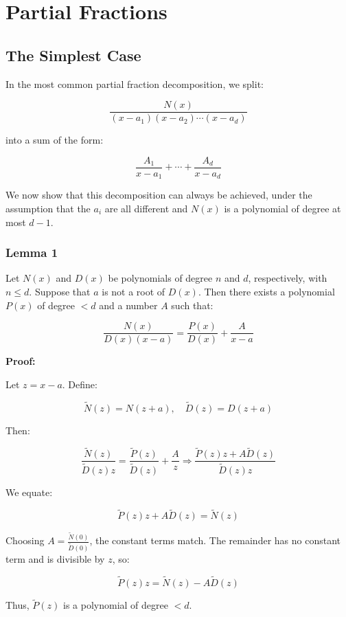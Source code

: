 \newpage
\section{Partial Fractions}

\subsection{The Simplest Case}

In the most common partial fraction decomposition, we split:

\[
    \frac{N(x)}{(x - a_1)(x - a_2)\cdots(x - a_d)}
\]

into a sum of the form:

\[
    \frac{A_1}{x - a_1} + \cdots + \frac{A_d}{x - a_d}
\]

We now show that this decomposition can always be achieved, under the assumption that the \(a_i\) are 
all different and \(N(x)\) is a polynomial of degree at most \(d - 1\).

\subsubsection{Lemma 1}

Let \(N(x)\) and \(D(x)\) be polynomials of degree \(n\) and \(d\), respectively, with \(n \leq d\). 
Suppose that \(a\) is not a root of \(D(x)\). Then there exists a polynomial \(P(x)\) of degree \(< d\) 
and a number \(A\) such that:

\[
    \frac{N(x)}{D(x)(x - a)} = \frac{P(x)}{D(x)} + \frac{A}{x - a}
\]

\textbf{Proof:} 

Let \(z = x - a\). Define:

\[
    \tilde{N}(z) = N(z + a), \quad \tilde{D}(z) = D(z + a)
\]

Then:

\[
    \frac{\tilde{N}(z)}{\tilde{D}(z)z} = \frac{\tilde{P}(z)}{\tilde{D}(z)} + \frac{A}{z}
    \Rightarrow \frac{\tilde{P}(z)z + A\tilde{D}(z)}{\tilde{D}(z)z}
\]

We equate:

\[
    \tilde{P}(z)z + A\tilde{D}(z) = \tilde{N}(z)
\]

Choosing \(A = \frac{\tilde{N}(0)}{\tilde{D}(0)}\), the constant terms match. The remainder has no 
constant term and is divisible by \(z\), so:

\[
    \tilde{P}(z)z = \tilde{N}(z) - A\tilde{D}(z)
\]

Thus, \(\tilde{P}(z)\) is a polynomial of degree \(< d\).

